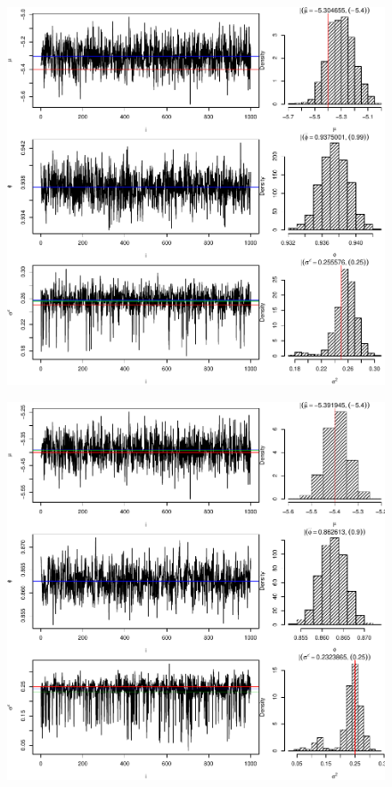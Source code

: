 \documentclass[12pt, a4paper]{article}
\begin{document}
\newpage
\begin{figure}[ht]
  \centering
  \includegraphics{img/p099s05_result025}
\end{figure}

\newpage
\begin{figure}[ht]
  \centering
  \includegraphics{img/p09s05_result030}
\end{figure}
\end{document}
